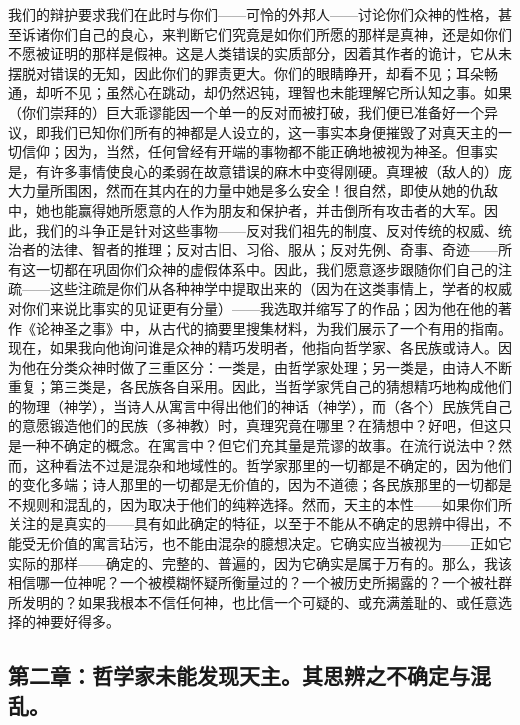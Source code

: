 我们的辩护要求我们在此时与你们——可怜的外邦人——讨论你们众神的性格，甚至诉诸你们自己的良心，来判断它们究竟是如你们所愿的那样是真神，还是如你们不愿被证明的那样是假神。这是人类错误的实质部分，因着其作者的诡计，它从未摆脱对错误的无知，因此你们的罪责更大。你们的眼睛睁开，却看不见；耳朵畅通，却听不见；虽然心在跳动，却仍然迟钝，理智也未能理解它所认知之事。如果（你们崇拜的）巨大乖谬能因一个单一的反对而被打破，我们便已准备好一个异议，即我们已知你们所有的神都是人设立的，这一事实本身便摧毁了对真天主的一切信仰；因为，当然，任何曾经有开端的事物都不能正确地被视为神圣。但事实是，有许多事情使良心的柔弱在故意错误的麻木中变得刚硬。真理被（敌人的）庞大力量所围困，然而在其内在的力量中她是多么安全！很自然，即使从她的仇敌中，她也能赢得她所愿意的人作为朋友和保护者，并击倒所有攻击者的大军。因此，我们的斗争正是针对这些事物——反对我们祖先的制度、反对传统的权威、统治者的法律、智者的推理；反对古旧、习俗、服从；反对先例、奇事、奇迹——所有这一切都在巩固你们众神的虚假体系中。因此，我们愿意逐步跟随你们自己的注疏——这些注疏是你们从各种神学中提取出来的（因为在这类事情上，学者的权威对你们来说比事实的见证更有分量）——我选取并缩写了的作品；因为他在他的著作《论神圣之事》中，从古代的摘要里搜集材料，为我们展示了一个有用的指南。现在，如果我向他询问谁是众神的精巧发明者，他指向哲学家、各民族或诗人。因为他在分类众神时做了三重区分：一类是，由哲学家处理；另一类是，由诗人不断重复；第三类是，各民族各自采用。因此，当哲学家凭自己的猜想精巧地构成他们的物理（神学），当诗人从寓言中得出他们的神话（神学），而（各个）民族凭自己的意愿锻造他们的民族（多神教）时，真理究竟在哪里？在猜想中？好吧，但这只是一种不确定的概念。在寓言中？但它们充其量是荒谬的故事。在流行说法中？然而，这种看法不过是混杂和地域性的。哲学家那里的一切都是不确定的，因为他们的变化多端；诗人那里的一切都是无价值的，因为不道德；各民族那里的一切都是不规则和混乱的，因为取决于他们的纯粹选择。然而，天主的本性——如果你们所关注的是真实的——具有如此确定的特征，以至于不能从不确定的思辨中得出，不能受无价值的寓言玷污，也不能由混杂的臆想决定。它确实应当被视为——正如它实际的那样——确定的、完整的、普遍的，因为它确实是属于万有的。那么，我该相信哪一位神呢？一个被模糊怀疑所衡量过的？一个被历史所揭露的？一个被社群所发明的？如果我根本不信任何神，也比信一个可疑的、或充满羞耻的、或任意选择的神要好得多。\par


\subsection{第二章：哲学家未能发现天主。其思辨之不确定与混乱。}

